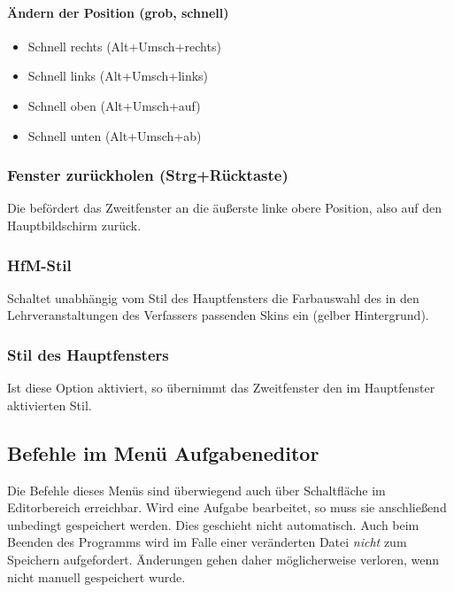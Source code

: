 \documentclass[a4paper,DIV=11
]{scrartcl}
\begin{document}
\hypertarget{uxe4ndern-der-position-grob-schnell}{%
\paragraph{Ändern der Position (grob,
schnell)}\label{uxe4ndern-der-position-grob-schnell}}

\begin{itemize}
\item
  Schnell rechts (Alt+Umsch+rechts)
\item
  Schnell links (Alt+Umsch+links)
\item
  Schnell oben (Alt+Umsch+auf)
\item
  Schnell unten (Alt+Umsch+ab)
\end{itemize}

\hypertarget{fenster-zuruxfcckholen-strgruxfccktaste}{%
\subsubsection{Fenster zurückholen
(Strg+Rücktaste)}\label{fenster-zuruxfcckholen-strgruxfccktaste}}

Die befördert das Zweitfenster an die äußerste linke obere Position,
also auf den Hauptbildschirm zurück.

\hypertarget{hfm-stil}{%
\subsubsection{HfM-Stil}\label{hfm-stil}}

Schaltet unabhängig vom Stil des Hauptfensters die Farbauswahl des in
den Lehrveranstaltungen des Verfassers passenden Skins ein (gelber
Hintergrund).

\hypertarget{stil-des-hauptfensters}{%
\subsubsection{Stil des Hauptfensters}\label{stil-des-hauptfensters}}

Ist diese Option aktiviert, so übernimmt das Zweitfenster den im
Hauptfenster aktivierten Stil.

\hypertarget{befehle-im-menuxfc-aufgabeneditor}{%
\subsection{Befehle im Menü
Aufgabeneditor}\label{befehle-im-menuxfc-aufgabeneditor}}

Die Befehle dieses Menüs sind überwiegend auch über Schaltfläche im
Editorbereich erreichbar. Wird eine Aufgabe bearbeitet, so muss sie
anschließend unbedingt gespeichert werden. Dies geschieht nicht
automatisch. Auch beim Beenden des Programms wird im Falle einer
veränderten Datei \emph{nicht} zum Speichern aufgefordert. Änderungen
gehen daher möglicherweise verloren, wenn nicht manuell gespeichert
wurde.
\end{document}
